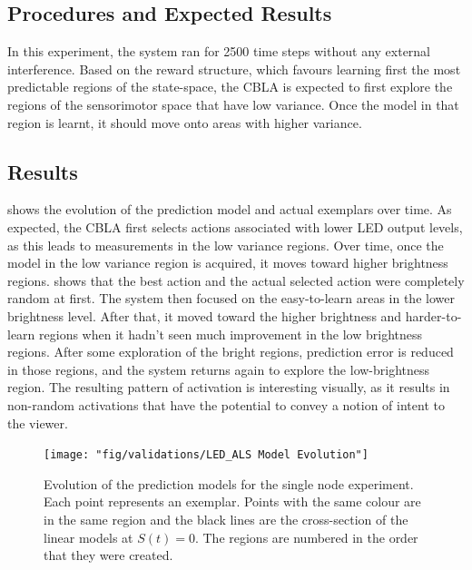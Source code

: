 \subsection{Procedures and Expected Results}
In this experiment, the system ran for 2500 time steps without any external interference. 
Based on the reward structure, which favours learning first the most predictable regions of the state-space, the CBLA is expected to first explore the regions of the sensorimotor space that have low variance. Once the model in that region is learnt, it should move onto areas with higher variance.

\subsection{Results}

 shows the evolution of the prediction model and actual exemplars over time. As expected, the CBLA first selects actions associated with lower LED output levels, as this leads to measurements in the low variance regions. Over time, once the model in the low variance region is acquired, it moves toward higher brightness regions.  shows that the best action and the actual selected action were completely random at first. The system then focused on the easy-to-learn areas in the lower brightness level. After that, it moved toward the higher brightness and harder-to-learn regions when it hadn't seen much improvement in the low brightness regions. After some exploration of the bright regions, prediction error is reduced in those regions, and the system returns again to explore the low-brightness region.  The resulting pattern of activation is interesting visually, as it results in non-random activations that have the potential to convey a notion of intent to the viewer. 
 
\begin{figure} [!htbp]
	\centering
	\texttt{[image: "fig/validations/LED\_ALS Model Evolution"]}
	\caption[Evolution of the prediction models for the single node experiment]{Evolution of the prediction models for the single node experiment. Each point represents an exemplar. Points with the same colour are in the same region and the black lines are the cross-section of the linear models at $S(t) = 0$. The regions are numbered in the order that they were created. }
	\label{fig:LED_ALS Model Evolution}
\end{figure}

